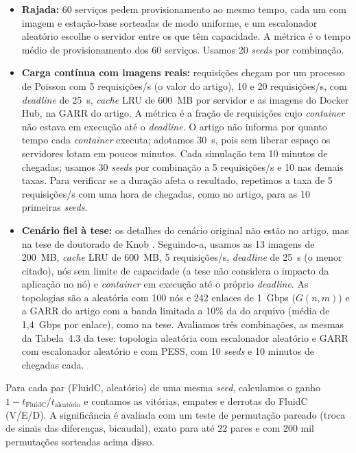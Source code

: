 \documentclass[12pt]{article}
\begin{document}
\begin{itemize}
  \item \textbf{Rajada:} 60 serviços pedem provisionamento ao mesmo tempo, cada um
  com imagem e estação-base sorteadas de modo uniforme, e um escalonador aleatório
  escolhe o servidor entre os que têm capacidade. A métrica é o tempo médio de
  provisionamento dos 60 serviços. Usamos 20 \textit{seeds} por combinação.
  \item \textbf{Carga contínua com imagens reais:} requisições chegam por um processo
  de Poisson com 5 requisições/s (o valor do artigo), 10 e 20 requisições/s, com
  \textit{deadline} de 25~s, \textit{cache} LRU de 600~MB por servidor e as
  imagens do Docker Hub, na GARR do artigo. A métrica é a fração de requisições
  cujo \textit{container} não estava em execução até o \textit{deadline}. O artigo
  não informa por quanto tempo cada \textit{container} executa; adotamos 30~s,
  pois sem liberar espaço os servidores lotam em poucos minutos. Cada simulação
  tem 10 minutos de chegadas; usamos 30 \textit{seeds} por combinação a 5
  requisições/s e 10 nas demais taxas. Para verificar se a duração afeta o
  resultado, repetimos a taxa de 5 requisições/s com uma hora de chegadas, como
  no artigo, para as 10 primeiras \textit{seeds}.
  \item \textbf{Cenário fiel à tese:} os detalhes do cenário original não estão no
  artigo, mas na tese de doutorado de Knob \cite[seç.~4.5]{knob2022}. Seguindo-a, usamos as 13 imagens de 200~MB, \textit{cache}
  LRU de 600~MB, 5 requisições/s, \textit{deadline} de 25~s (o menor citado),
  nós sem limite de capacidade (a tese não considera o impacto da aplicação no nó)
  e \textit{container} em execução até o próprio \textit{deadline}. As topologias
  são a aleatória com 100 nós e 242 enlaces de 1~Gbps ($G(n,m)$) e a GARR do
  artigo com a banda limitada a 10\% da do arquivo (média de 1,4~Gbps por enlace),
  como na tese. Avaliamos três combinações, as mesmas da Tabela~4.3 da tese:
  topologia aleatória com escalonador aleatório e GARR com escalonador aleatório e
  com PESS, com 10 \textit{seeds} e 10 minutos de chegadas cada.
\end{itemize}

Para cada par (FluidC, aleatório) de uma mesma \textit{seed}, calculamos o ganho
$1 - t_{\textrm{FluidC}}/t_{\textrm{aleatório}}$ e contamos as vitórias, empates
e derrotas do FluidC (V/E/D). A significância é avaliada com um teste de
permutação pareado (troca de sinais das diferenças, bicaudal), exato para até 22
pares e com 200 mil permutações sorteadas acima disso.
\end{document}
